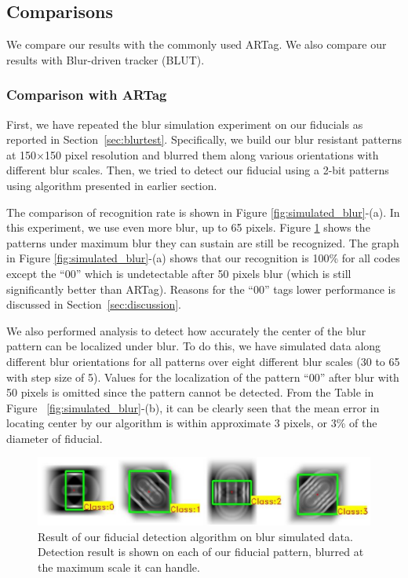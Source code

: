 \documentclass[10pt,twocolumn,letterpaper]{article}
\begin{document}
\subsection{Comparisons}

We compare our results with the commonly used ARTag. We also compare
our results with Blur-driven tracker (BLUT)\cite{Wu:2011}.
\subsubsection{Comparison with ARTag}
First, we have repeated the blur simulation experiment on our fiducials as reported
in Section~\ref{sec:blurtest}.  Specifically, we build our blur resistant
patterns at 150$\times$150 pixel resolution and blurred them along various
orientations with different blur scales. Then, we tried to detect our fiducial using a 2-bit
patterns using algorithm presented in earlier section.

The comparison of recognition rate is shown in Figure
\ref{fig:simulated_blur}-(a). In this experiment, we use even more blur, up to 65
pixels. Figure \ref{fig:blur_maximum} shows the patterns under maximum blur they
can sustain are still be recognized. The graph in Figure
\ref{fig:simulated_blur}-(a) shows that our recognition is 100\% for all codes
except the ``00'' which is undetectable after 50 pixels blur (which is still
significantly better than ARTag).  Reasons for the ``00'' tags lower
performance is discussed in Section~\ref{sec:discussion}.

We also performed analysis to detect how accurately the center of the blur pattern
can be localized under blur.  To do this, we have simulated data along different blur
orientations for all patterns over eight different blur scales (30 to 65 with
step size of 5). Values for the localization of the pattern ``00'' after blur
with 50 pixels is omitted since the pattern cannot be detected. From the Table in Figure
~\ref{fig:simulated_blur}-(b), it can be clearly seen that the mean error in
locating center by our algorithm is within approximate 3 pixels, or 3\% of the
diameter of fiducial.

\begin{figure}
\includegraphics[width=\linewidth]{blur_maximum.pdf}
\caption{Result of our fiducial detection algorithm on blur simulated data.
Detection result is shown on each of our fiducial pattern, blurred at the
maximum scale it can handle.}
\label{fig:blur_maximum}
\end{figure}
\end{document}
